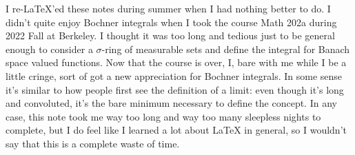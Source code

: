 
I re-LaTeX'ed these notes during summer when I had nothing better to do. I didn't quite enjoy Bochner integrals when I took the course Math 202a during 2022 Fall at Berkeley. I thought it was too long and tedious just to be general enough to consider a $\sigma$-ring of measurable sets and define the integral for Banach space valued functions. Now that the course is over, I, bare with me while I be a little cringe, sort of got a new appreciation for Bochner integrals. In some sense it's similar to how people first see the definition of a limit: even though it's long and convoluted, it's the bare minimum necessary to define the concept. In any case, this note took me way too long and way too many sleepless nights to complete, but I do feel like I learned a lot about LaTeX in general, so I wouldn't say that this is a complete waste of time.